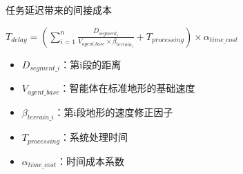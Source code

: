 \documentclass[
10pt,
aspectratio=169,
]{beamer}
\begin{document}
\begin{frame}
  \begin{alertblock}{任务延迟带来的间接成本}
 \end{alertblock}
 \begin{exampleblock}{}
$T_{delay} = \left(\sum_{i=1}^{n} \frac{D_{segment_i}}{V_{agent\_base} \times \beta_{terrain_i}} + T_{processing}\right) \times \alpha_{time\_cost}$
  \end{exampleblock}

 \begin{exampleblock}{}

                \begin{itemize}
				
                    \item $D_{segment\_i}$：第i段的距离
 \item $V_{agent\_base}$：智能体在标准地形的基础速度
 \item $\beta_{terrain\_i}$：第i段地形的速度修正因子
 \item $T_{processing}$：系统处理时间
 \item $\alpha_{time\_cost}$：时间成本系数
	
		
                    
                \end{itemize}
            \end{exampleblock}

\end{frame}	
\end{document}
